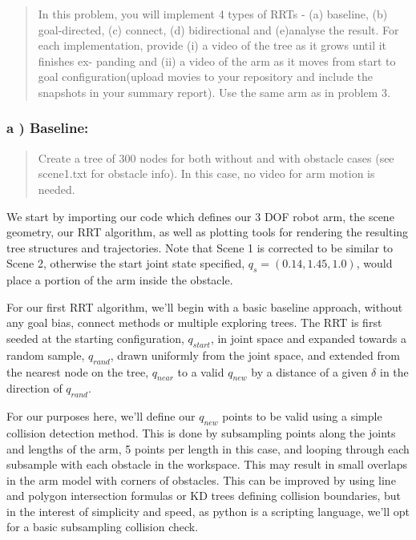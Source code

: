 \documentclass{article}
\begin{document}
    \begin{quote}
In this problem, you will implement 4 types of RRTs - (a) baseline, (b)
goal-directed, (c) connect, (d) bidirectional and (e)analyse the result.
For each implementation, provide (i) a video of the tree as it grows
until it finishes ex- panding and (ii) a video of the arm as it moves
from start to goal configuration(upload movies to your repository and
include the snapshots in your summary report). Use the same arm as in
problem 3.
\end{quote}


    \subsubsection{a ) Baseline:}


    \begin{quote}
Create a tree of 300 nodes for both without and with obstacle cases (see
scene1.txt for obstacle info). In this case, no video for arm motion is
needed.
\end{quote}

    We start by importing our code which defines our 3 DOF robot arm, the
scene geometry, our RRT algorithm, as well as plotting tools for
rendering the resulting tree structures and trajectories. Note that
Scene 1 is corrected to be similar to Scene 2, otherwise the start joint
state specified, $q_s = (0.14, 1.45, 1.0)$, would place a portion of the
arm inside the obstacle.


    For our first RRT algorithm, we'll begin with a basic baseline approach,
without any goal bias, connect methods or multiple exploring trees. The
RRT is first seeded at the starting configuration, $q_{start}$, in joint
space and expanded towards a random sample, $q_{rand}$, drawn uniformly
from the joint space, and extended from the nearest node on the tree,
$q_{near}$ to a valid $q_{new}$ by a distance of a given $\delta$ in the
direction of $q_{rand}$.

For our purposes here, we'll define our $q_{new}$ points to be valid
using a simple collision detection method. This is done by subsampling
points along the joints and lengths of the arm, 5 points per length in
this case, and looping through each subsample with each obstacle in the
workspace. This may result in small overlaps in the arm model with
corners of obstacles. This can be improved by using line and polygon
intersection formulas or KD trees defining collision boundaries, but in
the interest of simplicity and speed, as python is a scripting language,
we'll opt for a basic subsampling collision check.
\end{document}
